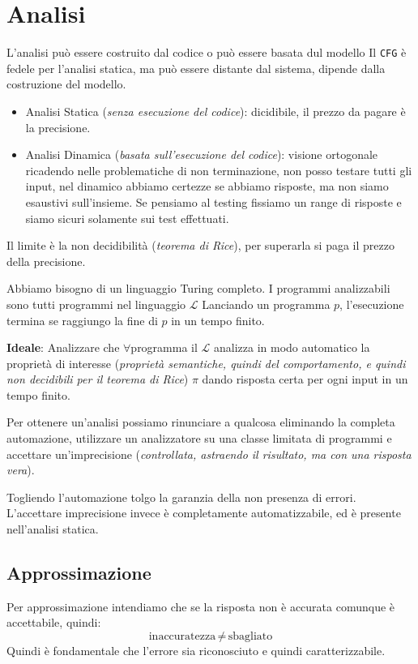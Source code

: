 \chapter{Analisi}
L'analisi può essere costruito dal codice o può essere basata dul modello
Il \verb|CFG| è fedele per l'analisi statica, ma può essere distante dal sistema, dipende dalla
costruzione del modello.
\begin{itemize}
    \item Analisi Statica (\textit{senza esecuzione del codice}): dicidibile, il prezzo da 
    pagare è la precisione.
    \item Analisi Dinamica (\textit{basata sull'esecuzione del codice}): visione ortogonale ricadendo nelle problematiche 
    di non terminazione, non posso testare tutti gli input, nel dinamico abbiamo certezze se abbiamo risposte, ma 
    non siamo esaustivi sull'insieme. Se pensiamo al testing fissiamo un range di risposte e siamo sicuri solamente 
    sui test effettuati.
\end{itemize}
Il limite è la non decidibilità (\textit{teorema di Rice}), per superarla si paga il prezzo della precisione.

Abbiamo bisogno di un linguaggio Turing completo. I programmi analizzabili sono tutti programmi nel linguaggio $\mathcal{L}$
Lanciando un programma $p$, l'esecuzione termina se raggiungo la fine di $p$ in un tempo finito.

\textbf{Ideale}: Analizzare che $\forall$programma il $\mathcal{L}$ analizza 
in modo automatico la proprietà di interesse (\textit{proprietà semantiche, quindi del comportamento,
e quindi non decidibili per il teorema di Rice}) $\pi$ dando risposta certa per ogni input in un tempo finito.

Per ottenere un'analisi possiamo rinunciare a qualcosa eliminando la completa automazione, utilizzare un analizzatore 
su una classe limitata di programmi e accettare un'imprecisione (\textit{controllata, astraendo il risultato, ma con una risposta vera}).

Togliendo l'automazione tolgo la garanzia della non presenza di errori. 
L'accettare imprecisione invece è completamente automatizzabile, ed è presente nell'analisi statica.

\section{Approssimazione}
Per approssimazione intendiamo che se la risposta non è accurata comunque è accettabile, quindi:
\[
\text{inaccuratezza}\, \not = \,\text{sbagliato}    
\]
Quindi è fondamentale che l'errore sia riconosciuto e quindi caratterizzabile.


